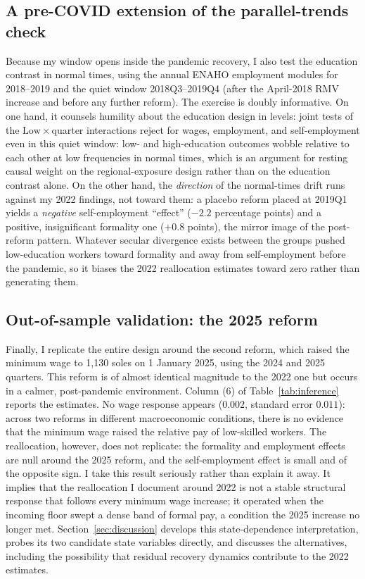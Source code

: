 \subsection{A pre-COVID extension of the parallel-trends check}

Because my window opens inside the pandemic recovery, I also test the education
contrast in normal times, using the annual ENAHO employment modules for 2018--2019 and
the quiet window 2018Q3--2019Q4 (after the April-2018 RMV increase and before any
further reform). The exercise is doubly informative. On one hand, it counsels
humility about the education design in levels: joint tests of the
$\mathrm{Low}\times$quarter interactions reject for wages, employment, and
self-employment even in this quiet window: low- and high-education outcomes wobble
relative to each other at low frequencies in normal times, which is an argument for
resting causal weight on the regional-exposure design rather than on the education
contrast alone. On the other hand, the \emph{direction} of the normal-times drift runs
against my 2022 findings, not toward them: a placebo reform placed at 2019Q1 yields a
\emph{negative} self-employment ``effect'' ($-2.2$ percentage points) and a positive,
insignificant formality one ($+0.8$ points), the mirror image of the post-reform
pattern. Whatever secular divergence exists between the groups pushed low-education
workers toward formality and away from self-employment before the pandemic, so it
biases the 2022 reallocation estimates toward zero rather than generating them.

\subsection{Out-of-sample validation: the 2025 reform}

Finally, I replicate the entire design around the second reform, which raised the minimum
wage to 1,130 soles on 1 January 2025, using the 2024 and 2025 quarters. This reform is
of almost identical magnitude to the 2022 one but occurs in a calmer, post-pandemic
environment. Column (6) of Table~\ref{tab:inference} reports the estimates. No wage
response appears ($0.002$, standard error $0.011$): across two reforms in different
macroeconomic conditions, there is no evidence that the minimum wage raised the relative
pay of low-skilled workers. The reallocation, however, does not replicate: the formality
and employment effects are null around the 2025 reform, and the self-employment effect
is small and of the opposite sign. I take this result seriously rather than explain it away. It
implies that the reallocation I document around 2022 is not a stable structural response
that follows every minimum wage increase; it operated when the incoming floor swept a
dense band of formal pay, a condition the 2025 increase no longer met.
Section~\ref{sec:discussion} develops this state-dependence interpretation, probes its
two candidate state variables directly, and discusses the alternatives, including the
possibility that residual recovery dynamics contribute to the 2022 estimates.
